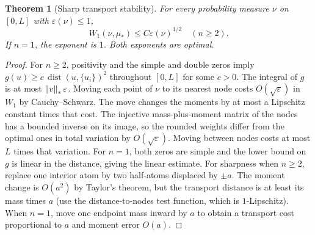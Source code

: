 \documentclass[11pt]{article}
\newtheorem{theorem}{Theorem}[section]
\theoremstyle{remark}\newtheorem{remark}[theorem]{Remark}
\begin{document}
\begin{theorem}[Sharp transport stability]\label{thm:stable}
For every probability measure $\nu$ on $[0,L]$ with $\varepsilon(\nu)\le1$,
\[
 W_1(\nu,\mu_*)\le C\varepsilon(\nu)^{1/2}\quad(n\ge2).
\]
If $n=1$, the exponent is $1$. Both exponents are optimal.
\end{theorem}
\begin{proof}
For $n\ge2$, positivity and the simple and double zeros imply $g(u)\ge c\,\operatorname{dist}(u,\{u_i\})^2$ throughout $[0,L]$ for some $c>0$. The integral of $g$ is at most $\left\|v\right\|_*\varepsilon$. Moving each point of $\nu$ to its nearest node costs $O(\sqrt\varepsilon)$ in $W_1$ by Cauchy--Schwarz. The move changes the moments by at most a Lipschitz constant times that cost. The injective mass-plus-moment matrix of the nodes has a bounded inverse on its image, so the rounded weights differ from the optimal ones in total variation by $O(\sqrt\varepsilon)$. Moving between nodes costs at most $L$ times that variation. For $n=1$, both zeros are simple and the lower bound on $g$ is linear in the distance, giving the linear estimate. For sharpness when $n\ge2$, replace one interior atom by two half-atoms displaced by $\pm a$. The moment change is $O(a^2)$ by Taylor's theorem, but the transport distance is at least its mass times $a$ (use the distance-to-nodes test function, which is $1$-Lipschitz). When $n=1$, move one endpoint mass inward by $a$ to obtain a transport cost proportional to $a$ and moment error $O(a)$.
\end{proof}
\end{document}
